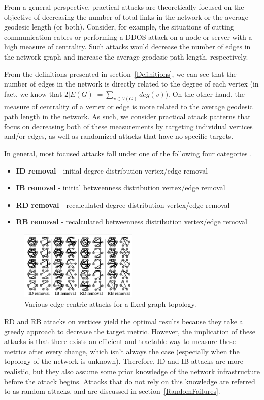 \documentclass[11pt]{article}
\begin{document}
From a general perspective, practical attacks are theoretically focused on the objective of decreasing the number of total links in the network or the average geodesic length (or both). Consider, for example, the situations of cutting communication cables or performing a DDOS attack on a node or server with a high measure of centrality. Such attacks would decrease the number of edges in the network graph and increase the average geodesic path length, respectively. 

From the definitions presented in section~\ref{Definitions}, we can see that the number of edges in the network is directly related to the degree of each vertex (in fact, we know that $2|E(G)| =\sum_{v \in V(G)}deg(v)$). On the other hand, the measure of centrality of a vertex or edge is more related to the average geodesic path length in the network. As such, we consider practical attack patterns that focus on decreasing both of these measurements by targeting individual vertices and/or edges, as well as randomized attacks that have no specific targets. 

In general, most focused attacks fall under one of the following four categories \cite{Attacks}.
\begin{itemize}
	\item \textbf{ID removal} - initial degree distribution vertex/edge removal
	\item \textbf{IB removal} - initial betweenness distribution vertex/edge removal
	\item \textbf{RD removal} - recalculated degree distribution vertex/edge removal
	\item \textbf{RB removal} - recalculated betweenness distribution vertex/edge removal
\end{itemize}

\begin{figure}[h!]
	\label{fig:Onion}
	\centering
		\includegraphics[width=0.5\textwidth]{edge_attacks.png}
	\caption{Various edge-centric attacks for a fixed graph topology.}
\end{figure}

RD and RB attacks on vertices yield the optimal results because they take a greedy approach to decrease the target metric. However, the implication of these attacks is that there exists an efficient and tractable way to measure these metrics after every change, which isn't always the case (especially when the topology of the network is unknown). Therefore, ID and IB attacks are more realistic, but they also assume some prior knowledge of the network infrastructure before the attack begins. Attacks that do not rely on this knowledge are referred to as random attacks, and are discussed in section~\ref{RandomFailures}.
\end{document}
